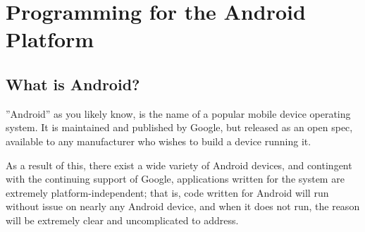 \section{Programming for the Android Platform}

\subsection{What is Android?}
''Android'' as you likely know, is the name of a popular mobile device operating system. It is maintained and published by Google,
but released as an open spec, available to any manufacturer who wishes to build a device running it.

As a result of this, there exist a
wide variety of Android devices, and contingent with the continuing support of Google, applications written for the system are 
extremely platform-independent; that is, code written for Android will run without issue on nearly any Android device, and when it
does not run, the reason will be extremely clear and uncomplicated to address.

